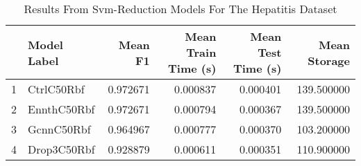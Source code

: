 \begin{table}
\centering
\caption{Results From Svm-Reduction Models For The Hepatitis Dataset}
\label{tab:svm_reduction_results_hepatitis}
\begin{tabular}{rlrrrr}
\toprule
 & Model Label & Mean F1 & Mean Train Time (s) & Mean Test Time (s) & Mean Storage \\
\midrule
1 & CtrlC50Rbf & 0.972671 & 0.000837 & 0.000401 & 139.500000 \\
2 & EnnthC50Rbf & 0.972671 & 0.000794 & 0.000367 & 139.500000 \\
3 & GcnnC50Rbf & 0.964967 & 0.000777 & 0.000370 & 103.200000 \\
4 & Drop3C50Rbf & 0.928879 & 0.000611 & 0.000351 & 110.900000 \\
\bottomrule
\end{tabular}
\end{table}
